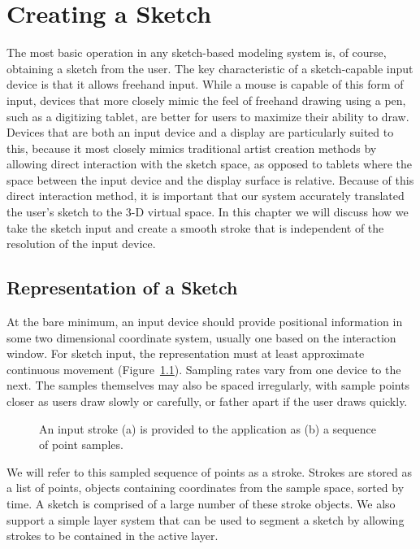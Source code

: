 \chapter{Creating a Sketch}

The most basic operation in any sketch-based modeling system is, of course, obtaining a sketch from the user.
The key characteristic of a sketch-capable input device is that it allows freehand input.
While a mouse is capable of this form of input, devices that more closely mimic the feel of freehand drawing using a pen, such as a digitizing tablet, are better for users to maximize their ability to draw.
Devices that are both an input device and a display are particularly suited to this, because it most closely mimics traditional artist creation methods by allowing direct interaction with the sketch space, as opposed to tablets where the space between the input device and the display surface is relative.
Because of this direct interaction method, it is important that our system accurately translated the user's sketch to the 3-D virtual space.
In this chapter we will discuss how we take the sketch input and create a smooth stroke that is independent of the resolution of the input device.

\section{Representation of a Sketch}

At the bare minimum, an input device should provide positional information in some two dimensional coordinate system, usually one based on the interaction window.
For sketch input, the representation must at least approximate continuous movement (Figure~\ref{fig:sampledata}).
Sampling rates vary from one device to the next.
The samples themselves may also be spaced irregularly, with sample points closer as users draw slowly or carefully, or father apart if the user draws quickly.

\begin{figure}
\label{fig:sampledata}
\caption{An input stroke (a) is provided to the application as (b) a sequence of point samples.}
\end{figure}

We will refer to this sampled sequence of points as a stroke. 
Strokes are stored as a list of points, objects containing coordinates from the sample space, sorted by time.
A sketch is comprised of a large number of these stroke objects.
We also support a simple layer system that can be used to segment a sketch by allowing strokes to be contained in the active layer.


